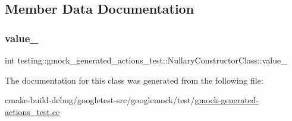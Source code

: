 \subsection{Member Data Documentation}
\mbox{\label{classtesting_1_1gmock__generated__actions__test_1_1NullaryConstructorClass_aa877ccc5aff335cbf81b8de90abee732}} 
\subsubsection{\texorpdfstring{value\_}{value\_}}
{\footnotesize\ttfamily int testing\+::gmock\+\_\+generated\+\_\+actions\+\_\+test\+::\+Nullary\+Constructor\+Class\+::value\+\_\+}



The documentation for this class was generated from the following file\+:\begin{DoxyCompactItemize}
\item 
cmake-\/build-\/debug/googletest-\/src/googlemock/test/\mbox{\hyperlink{gmock-generated-actions__test_8cc}{gmock-\/generated-\/actions\+\_\+test.\+cc}}\end{DoxyCompactItemize}
